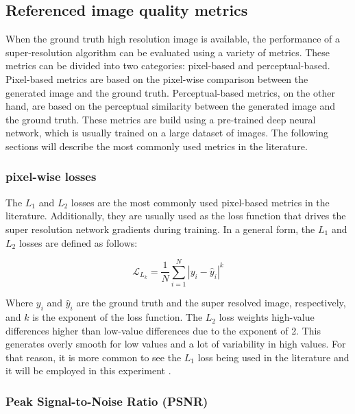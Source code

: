     \subsection{Referenced image quality metrics}

        When the ground truth high resolution image is available, the performance of a super-resolution algorithm can be evaluated using a variety of metrics. 
        These metrics can be divided into two categories: pixel-based and perceptual-based.
        Pixel-based metrics are based on the pixel-wise comparison between the generated image and the ground truth. 
        Perceptual-based metrics, on the other hand, are based on the perceptual similarity between the generated image and the ground truth. 
        These metrics are build using a pre-trained deep neural network, which is usually trained on a large dataset of images.
        The following sections will describe the most commonly used metrics in the literature.

        \subsubsection{pixel-wise losses}

            The $L_1$ and $L_2$ losses are the most commonly used pixel-based metrics in the literature. 
            Additionally, they are usually used as the loss function that drives the super resolution network gradients during training. 
            In a general form, the $L_1$ and $L_2$ losses are defined as follows:

            \begin{equation}
                \mathcal{L}_{L_k} = \frac{1}{N} \sum_{i=1}^{N} |y_i - \hat{y}_i|^k
            \end{equation}

            Where $y_i$ and $\hat{y}_i$ are the ground truth and the super resolved image, respectively, and $k$ is the exponent of the loss function. 
            The $L_2$ loss weights high-value differences higher than low-value differences due to the exponent of 2. 
            This generates overly smooth for low values and a lot of variability in high values. 
            For that reason, it is more common to see the $L_1$ loss being used in the literature and it will be employed in this experiment .

        \subsubsection{Peak Signal-to-Noise Ratio (PSNR)}

